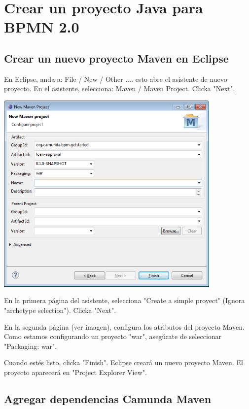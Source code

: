 \documentclass{article}
\begin{document}
\tableofcontents

\newpage

\section{Crear un proyecto Java para BPMN 2.0}
\subsection{Crear un nuevo proyecto Maven en Eclipse}

En Eclipse, anda a: File / New / Other .... esto abre el asistente de nuevo proyecto. En el asistente, selecciona: Maven / Maven Project. Clicka "Next".

\begin{center}
\includegraphics[width=\textwidth, height=10cm]{eclipse-new-project.png}
\end{center}

En la primera página del asistente, selecciona "Create a simple proyect" (Ignora "archetype selection"). Clicka "Next".

En la segunda página (ver imagen), configura los atributos del proyecto Maven. Como estamos configurando un proyecto "war", asegúrate de seleccionar "Packaging: war".

Cuando estés listo, clicka "Finish". Eclipse creará un nuevo proyecto Maven. El proyecto aparecerá en "Project Explorer View".


\newpage
\subsection{Agregar dependencias Camunda Maven}
\end{document}
